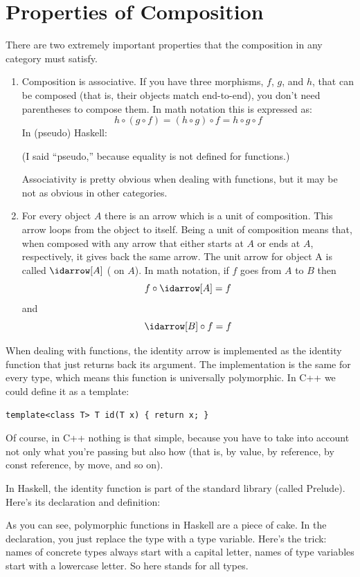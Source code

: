 \section{Properties of Composition}

There are two extremely important properties that the composition in any
category must satisfy.

\begin{enumerate}
\item
Composition is associative. If you have three morphisms, $f$, $g$, and $h$,
that can be composed (that is, their objects match end-to-end), you
don't need parentheses to compose them. In math notation this is
expressed as:
\[h \circ (g \circ f) = (h \circ g) \circ f = h \circ g \circ f\]
In (pseudo) Haskell:

(I said ``pseudo,'' because equality is not defined for functions.)

Associativity is pretty obvious when dealing with functions, but it may
be not as obvious in other categories.

\item
For every object $A$ there is an arrow which is a unit of composition.
This arrow loops from the object to itself. Being a unit of composition
means that, when composed with any arrow that either starts at $A$ or ends
at $A$, respectively, it gives back the same arrow. The unit arrow for
object A is called $\idarrow[A]$ ( on $A$). In math
notation, if $f$ goes from $A$ to $B$ then
\[f \circ \idarrow[A] = f\]
and
\[\idarrow[B] \circ f = f\]
\end{enumerate}
When dealing with functions, the identity arrow is implemented as the
identity function that just returns back its argument. The
implementation is the same for every type, which means this function is
universally polymorphic. In C++ we could define it as a template:

\begin{Verbatim}
template<class T> T id(T x) { return x; }
\end{Verbatim}
Of course, in C++ nothing is that simple, because you have to take into
account not only what you're passing but also how (that is, by value, by
reference, by const reference, by move, and so on).

In Haskell, the identity function is part of the standard library
(called Prelude). Here's its declaration and definition:

As you can see, polymorphic functions in Haskell are a piece of cake. In
the declaration, you just replace the type with a type variable. Here's
the trick: names of concrete types always start with a capital letter,
names of type variables start with a lowercase letter. So here
 stands for all types.


